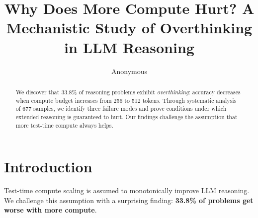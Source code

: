 \documentclass{article}
\title{Why Does More Compute Hurt? A Mechanistic Study of Overthinking in LLM Reasoning}
\author{Anonymous}
\begin{document}
\maketitle

\begin{abstract}
We discover that 33.8\% of reasoning problems exhibit \emph{overthinking}: accuracy decreases when compute budget increases from 256 to 512 tokens. Through systematic analysis of 677 samples, we identify three failure modes and prove conditions under which extended reasoning is guaranteed to hurt. Our findings challenge the assumption that more test-time compute always helps.
\end{abstract}

\section{Introduction}
Test-time compute scaling is assumed to monotonically improve LLM reasoning. We challenge this assumption with a surprising finding: \textbf{33.8\% of problems get worse with more compute}.
\end{document}
